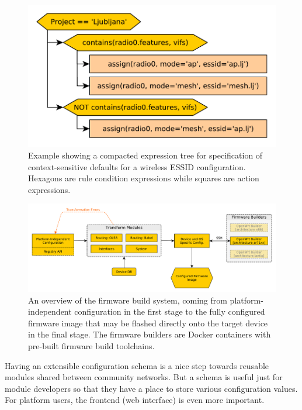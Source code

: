 \documentclass[5p,sort&compress]{elsarticle}
\begin{document}
\begin{figure}[t]
  \centering
  \includegraphics[scale=0.5]{figures/defaults-rules-tree.pdf}
  \caption{Example showing a compacted expression tree for specification of context-sensitive defaults for a wireless ESSID configuration. Hexagons are rule condition expressions while squares are action expressions.}
  \label{fig:defaults-rules-example}
\end{figure}

\begin{figure}
  \centering
  \includegraphics[scale=0.5]{figures/firmware-buildsystem.pdf}
  \caption{An overview of the firmware build system, coming from platform-independent configuration in the first stage to the fully configured firmware image that may be flashed directly onto the target device in the final stage.
The firmware builders are Docker containers with pre-built firmware build toolchains.}
  \label{fig:firmware-build-system}
\end{figure}

Having an extensible configuration schema is a nice step towards reusable modules shared between community networks.
But a schema is useful just for module developers so that they have a place to store various configuration values.
For platform users, the frontend (web interface) is even more important.
\end{document}
